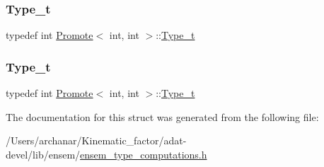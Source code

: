 \subsubsection{\texorpdfstring{Type\_t}{Type\_t}\hspace{0.1cm}{\footnotesize\ttfamily [2/3]}}
{\footnotesize\ttfamily typedef int \mbox{\hyperlink{structPromote}{Promote}}$<$ int, int $>$\+::\mbox{\hyperlink{structPromote_3_01int_00_01int_01_4_ad4def87f556a8315eb477252cb57c27b}{Type\+\_\+t}}}

\mbox{\label{structPromote_3_01int_00_01int_01_4_ad4def87f556a8315eb477252cb57c27b}} 
\subsubsection{\texorpdfstring{Type\_t}{Type\_t}\hspace{0.1cm}{\footnotesize\ttfamily [3/3]}}
{\footnotesize\ttfamily typedef int \mbox{\hyperlink{structPromote}{Promote}}$<$ int, int $>$\+::\mbox{\hyperlink{structPromote_3_01int_00_01int_01_4_ad4def87f556a8315eb477252cb57c27b}{Type\+\_\+t}}}



The documentation for this struct was generated from the following file\+:\begin{DoxyCompactItemize}
\item 
/\+Users/archanar/\+Kinematic\+\_\+factor/adat-\/devel/lib/ensem/\mbox{\hyperlink{adat-devel_2lib_2ensem_2ensem__type__computations_8h}{ensem\+\_\+type\+\_\+computations.\+h}}\end{DoxyCompactItemize}
